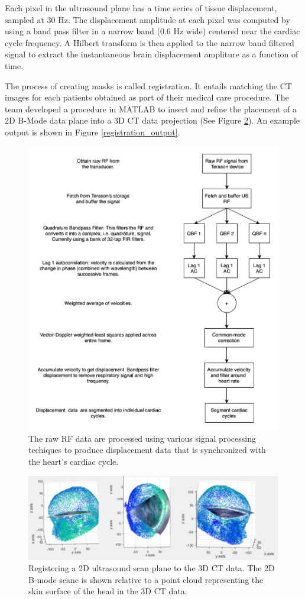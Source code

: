 \documentclass [11pt, proquest] {uwthesis}[2020/02/24]
\begin{document}
Each pixel in the ultrasound plane has a time series of tissue displacement, sampled at 30 Hz. The displacement amplitude at each pixel was 
computed by using a band pass filter in a narrow band (0.6 Hz wide) centered near the cardiac cycle frequency. A Hilbert transform is then 
applied to the narrow band filtered signal to extract the instantaneous brain displacement ampliture as a function of time. 

The process of creating masks is called registration. It entails matching the CT images for each patients obtained as part of their medical
care procedure. The team developed a procedure in MATLAB to insert and refine the placement of a 2D B-Mode data plane into a 3D CT data projection
(See Figure \ref{registration}). An example output is shown in Figure \ref{registration_output}.

\begin{figure}
  \centering
  \includegraphics[width=0.9\linewidth]{figures/signal_processing.png}
  \caption{The raw RF data are processed using various signal processing techiques to produce displacement data that is synchronized 
  with the heart's cardiac cycle.}
  \label{signal_processing}
\end{figure}

\begin{figure}
  \centering
  \includegraphics[width=0.9\linewidth]{figures/registration.png}
  \caption{Registering a 2D ultrasound scan plane to the 3D CT data. The 2D B-mode scane is shown relative to a point cloud representing 
  the skin surface of the head in the 3D CT data.}
  \label{registration}
\end{figure}
\end{document}
